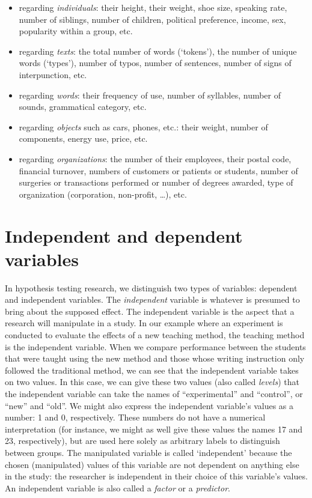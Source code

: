 \documentclass[
]{book}
\begin{document}
\begin{itemize}
\item
  regarding \emph{individuals}: their height, their weight, shoe size, speaking rate, number of siblings, number of children, political preference, income, sex, popularity within a group, etc.
\item
  regarding \emph{texts}: the total number of words (`tokens'), the number of unique words (`types'), number of typos, number of sentences, number of signs of interpunction, etc.
\item
  regarding \emph{words}: their frequency of use, number of syllables, number of sounds, grammatical category, etc.
\item
  regarding \emph{objects} such as cars, phones, etc.: their weight, number of components, energy use, price, etc.
\item
  regarding \emph{organizations}: the number of their employees, their postal code, financial turnover, numbers of customers or patients or students, number of surgeries or transactions performed or number of degrees awarded, type of organization (corporation, non-profit, \ldots), etc.
\end{itemize}

\section{Independent and dependent variables}\label{sec:independendependentvariables}

In hypothesis testing research, we distinguish two types of variables: dependent and independent variables. The \emph{independent} variable is whatever is presumed to bring about the supposed effect. The independent variable is the aspect that a research will manipulate in a study. In our example where an experiment is conducted to evaluate the effects of a new teaching method, the teaching method is the independent variable. When we compare performance between the students that were taught using the new method and those whose writing instruction only followed the traditional method, we can see that the independent variable takes on two values. In this case, we can give these two values (also called \emph{levels}) that the independent variable can take the names of ``experimental'' and ``control'', or ``new'' and ``old''. We might also express the independent variable's values as a number: 1 and 0, respectively. These numbers do not have a numerical interpretation (for instance, we might as well give these values the names 17 and 23, respectively), but are used here solely as arbitrary labels to distinguish between groups. The manipulated variable is called `independent' because the chosen (manipulated) values of this variable are not dependent on anything else in the study: the researcher is independent in their choice of this variable's values. An independent variable is also called a \emph{factor} or a \emph{predictor}.
\end{document}
